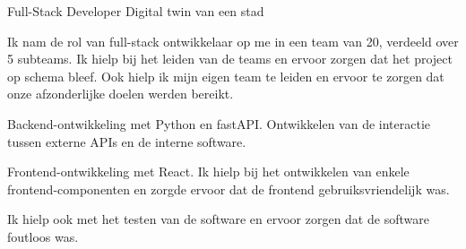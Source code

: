 

\begin{cventries}


    \cventry
    {Full-Stack Developer} %
    {Digital twin van een stad} %
    {} 
    {}
    {
      \begin{cvitems} %
        \item {Ik nam de rol van full-stack ontwikkelaar op me in een team van 20, verdeeld over 5 subteams. Ik hielp bij het leiden van de teams en ervoor zorgen dat het project op schema bleef. Ook hielp ik mijn eigen team te leiden en ervoor te zorgen dat onze afzonderlijke doelen werden bereikt.}
        \item {Backend-ontwikkeling met Python en fastAPI. Ontwikkelen van de interactie tussen externe APIs en de interne software.}
        \item {Frontend-ontwikkeling met React. Ik hielp bij het ontwikkelen van enkele frontend-componenten en zorgde ervoor dat de frontend gebruiksvriendelijk was.}
        \item {Ik hielp ook met het testen van de software en ervoor zorgen dat de software foutloos was.}
      \end{cvitems}
    }


\end{cventries}
